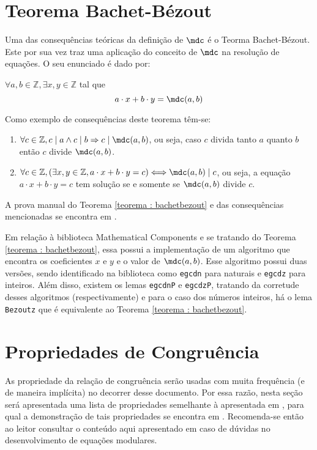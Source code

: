 \section{Teorema Bachet-Bézout}

Uma das consequências teóricas da definição de $\mdc$ é o Teorma Bachet-Bézout. Este por sua vez traz uma aplicação do conceito de $\mdc$ na resolução de equações. O seu enunciado é dado por:
\begin{teorema} \label{teorema : bachetbezout}
    $\forall a, b \in \mathbb{Z}, \exists x, y \in \mathbb{Z}$ tal que
    \begin{equation*}
        a \cdot x + b \cdot y = \mdc(a, b)
    \end{equation*}
\end{teorema}
\noindent
Como exemplo de consequências deste teorema têm-se:
\begin{enumerate}
    \item $\forall c \in \mathbb{Z}, c \mid a \land c \mid b \Rightarrow c \mid \mdc(a, b)$, ou seja, caso $c$ divida tanto $a$ quanto $b$ então $c$ divide $\mdc(a, b)$.
    \item $\forall c \in \mathbb{Z}, (\exists x, y \in \mathbb{Z}, a \cdot x + b \cdot y = c) \Longleftrightarrow \mdc(a, b) \mid c $, ou seja, a equação $a \cdot x + b \cdot y = c$ tem solução se e somente se $\mdc(a, b)$ divide $c$.
\end{enumerate}
A prova manual do Teorema \ref{teorema : bachetbezout} e das consequências mencionadas se encontra em \cite[p.~20-21]{book:2399854}. 

    Em relação à biblioteca Mathematical Components e se tratando do Teorema \ref{teorema : bachetbezout}, essa possui a implementação de um algoritmo
    que encontra os coeficientes $x$ e $y$ e o valor de $\mdc(a,b)$. Esse algoritmo possui duas versões, sendo identificado na biblioteca como \lstinline[language = coq]{egcdn} para naturais e \lstinline[language = coq]{egcdz} para inteiros. Além disso, existem os lemas \lstinline[language = coq]{egcdnP} e \lstinline[language = coq]{egcdzP}, tratando da corretude desses algoritmos (respectivamente) e para o caso dos números inteiros, há o lema \lstinline[language = coq]{Bezoutz} que é equivalente ao Teorema \ref{teorema : bachetbezout}.

\section{Propriedades de Congruência}
As propriedade da relação de congruência serão usadas com muita frequência (e de maneira implícita) no decorrer desse documento. Por essa razão, nesta seção será apresentada uma lista de propriedades semelhante à apresentada em \cite[p.~34]{book:2399854}, para qual a demonstração de tais propriedades se encontra em \cite[p.~34-35]{book:2399854}. Recomenda-se então ao leitor consultar o conteúdo aqui apresentado em caso de dúvidas no desenvolvimento de equações modulares.
    
